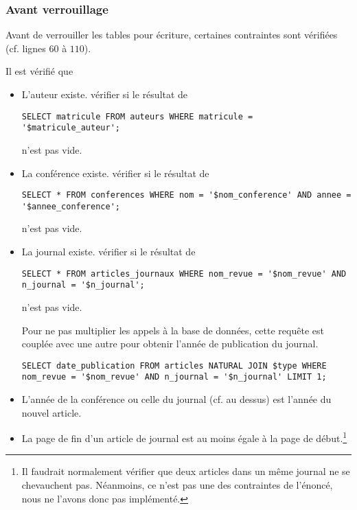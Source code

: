 \documentclass[a4paper, 12pt]{article}
\begin{document}
    \subsubsection{Avant verrouillage}
    Avant de verrouiller les tables pour écriture, certaines contraintes sont vérifiées (cf. lignes $60$ à $110$). \par
    Il est vérifié que
    \begin{itemize}[leftmargin=*]
        \item L'auteur existe. \Cad{} vérifier si le résultat de
        \begin{lstlisting}[style=sql, gobble=12]
            SELECT matricule FROM auteurs WHERE matricule = '$matricule_auteur';
        \end{lstlisting}
        n'est pas vide.
        \item La conférence existe. \Cad{} vérifier si le résultat de
        \begin{lstlisting}[style=sql, gobble=12]
            SELECT * FROM conferences WHERE nom = '$nom_conference' AND annee = '$annee_conference';
        \end{lstlisting}
        n'est pas vide.
        \item La journal existe. \Cad{} vérifier si le résultat de
        \begin{lstlisting}[style=sql, gobble=12]
            SELECT * FROM articles_journaux WHERE nom_revue = '$nom_revue' AND n_journal = '$n_journal';
        \end{lstlisting}
        n'est pas vide. \par
        Pour ne pas multiplier les appels à la base de données, cette requête est couplée avec une autre pour obtenir l'année de publication du journal.
        \begin{lstlisting}[style=sql, gobble=12]
            SELECT date_publication FROM articles NATURAL JOIN $type WHERE nom_revue = '$nom_revue' AND n_journal = '$n_journal' LIMIT 1;
        \end{lstlisting}
        \item L'année de la conférence ou celle du journal (cf. au dessus) est l'année du nouvel article.
        \item La page de fin d'un article de journal est au moins égale à la page de début.\footnote{Il faudrait normalement vérifier que deux articles dans un même journal ne se chevauchent pas. Néanmoins, ce n'est pas une des contraintes de l'énoncé, nous ne l'avons donc pas implémenté.}
    \end{itemize}
\end{document}
